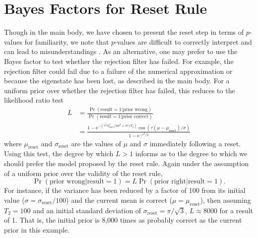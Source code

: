 \documentclass[aps,pra,amsmath,twocolumn,amssymb,superscriptaddress]{revtex4-1}
\newcommand{\reset}{\mathrm{reset}}
\newcommand{\ee}{\mathrm{e}}
\begin{document}
\section{Bayes Factors for Reset Rule}
\label{app:bf}

Though in the main body, we have chosen to present the reset step in terms of
$p$-values for familiarity, we note that $p$-values are difficult to correctly
interpret and can lead to misunderstandings \cite{goodman_dirty_2008,hoekstra_robust_2014}. As an
alternative, one may prefer to use the Bayes factor to test whether the rejection
filter has failed. For example, the rejection filter could fail due to
a failure of the numerical approximation or because the eigenstate has
been lost, as described in the main body. For a uniform prior over
whether the rejection filter has failed, this reduces to the likelihood
ratio test
\begin{subequations}
    \begin{align}
        L & = \frac{\Pr(\text{result} = 1 | \text{prior wrong})}{\Pr(\text{result} = 1 | \text{prior correct})} \\
          & = \frac{                  
                  1 - \ee^{
                          - (\tau^2 \sigma_\reset^2 / 2 \sigma^2 + \sigma \tau / T_2)
                      }
                      \cos \left(
                        \tau \left(\mu -\mu _\reset \right) / \sigma
                      \right)
              }{
                  1-\ee^{-\tau^2 / 2}
              }
    \end{align}
\end{subequations}
where $\mu_\reset$ and $\sigma_\reset$ are the values of $\mu$ and $\sigma$
immediately following a reset. Using this test, the degree by which $L > 1$
informs as to the degree to which we should prefer the model proposed by the
reset rule. Again under the assumption of a uniform prior over the
validity of the reset rule,
\begin{equation}
    \Pr(\text{prior wrong} | \text{result} = 1) = L \Pr(\text{prior right} | \text{result} = 1).
\end{equation}
For instance, if the variance has been reduced by a factor of 100 from
its initial value ($\sigma = \sigma_\reset / 100$) and the current mean is
correct ($\mu = \mu_\reset$), then assuming $T_2 = 100$ and an initial standard
deviation of $\sigma_\reset = \pi / \sqrt{3}$, $L\approx8000$ for a result of
1. That is, the initial prior is 8,000 times as probably correct as the current
prior in this example.
\end{document}
